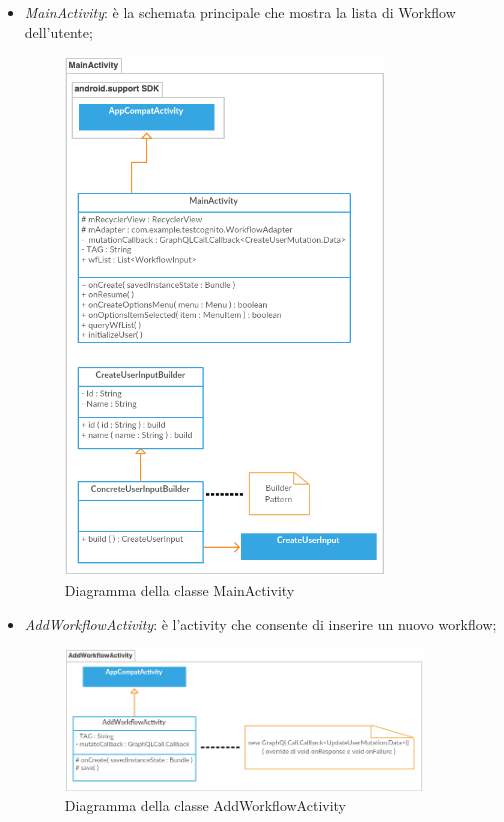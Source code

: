 \begin{itemize}
   \item \emph{MainActivity}: è la schemata principale che mostra la lista di Workflow dell'utente;
        \begin{figure}[H]
	    \begin{center}
		\includegraphics[width=0.8\textwidth, keepaspectratio]{../includes/pics/mainactivity.png}
		\caption{Diagramma della classe MainActivity}
	    \end{center}
        \end{figure}
        
    \item \emph{AddWorkflowActivity}: è l'activity che consente di inserire un nuovo workflow;
       \begin{figure}[H]
	   \begin{center}
		\includegraphics[width=0.9\textwidth, keepaspectratio]{../includes/pics/addworkflowactivity.png}
		\caption{Diagramma della classe AddWorkflowActivity}
	   \end{center}
       \end{figure}
   

\end{itemize}
